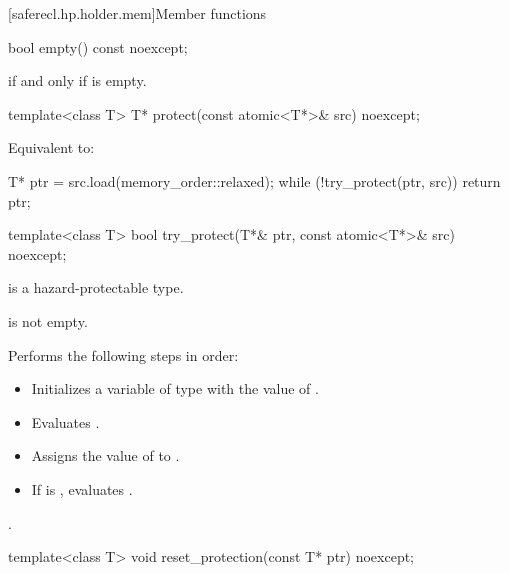 [saferecl.hp.holder.mem]{Member functions}

%
\begin{itemdecl}
bool empty() const noexcept;
\end{itemdecl}

\begin{itemdescr}
\pnum
\returns
{} if and only if  is empty.
\end{itemdescr}

%
\begin{itemdecl}
template<class T> T* protect(const atomic<T*>& src) noexcept;
\end{itemdecl}

\begin{itemdescr}
\pnum
\effects
Equivalent to:
\begin{codeblock}
T* ptr = src.load(memory_order::relaxed);
while (!try_protect(ptr, src)) {}
return ptr;
\end{codeblock}
\end{itemdescr}

%
\begin{itemdecl}
template<class T> bool try_protect(T*& ptr, const atomic<T*>& src) noexcept;
\end{itemdecl}

\begin{itemdescr}
\pnum
\mandates
{} is a hazard-protectable type.

\pnum
\expects
{} is not empty.

\pnum
\effects
Performs the following steps in order:
\begin{itemize}
\item Initializes a variable  of type  with the value of .
\item Evaluates .
\item Assigns the value of  to .
\item If  is ,
evaluates .
\end{itemize}

\pnum
\returns
{}.
\end{itemdescr}

%
\begin{itemdecl}
template<class T> void reset_protection(const T* ptr) noexcept;
\end{itemdecl}

